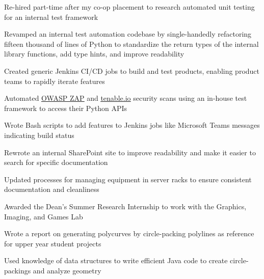 \begin{bullets}
    \item Re-hired part-time after my co-op placement to research automated unit testing for an internal test framework
    \item Revamped an internal test automation codebase by single-handedly refactoring fifteen thousand of lines of Python to standardize the return types of the internal library functions, add type hints, and improve readability
    \item Created generic Jenkins CI/CD jobs to build and test products, enabling product teams to rapidly iterate features
    \item Automated \href{https://www.zaproxy.org/}{\underline{OWASP ZAP}} and \href{https://www.tenable.com/products/tenable-io}{\underline{tenable.io}} security scans using an in-house test framework to access their Python APIs
    \item Wrote Bash scripts to add features to Jenkins jobs like Microsoft Teams messages indicating build status
    \item Rewrote an internal SharePoint site to improve readability and make it easier to search for specific documentation
    \item Updated processes for managing equipment in server racks to ensure consistent documentation and cleanliness
\end{bullets}

\hbox{}

\begin{bullets}
    \item Awarded the Dean's Summer Research Internship to work with the Graphics, Imaging, and Games Lab
    \item Wrote a report on generating polycurves by circle-packing polylines as reference for upper year student projects
    \item Used knowledge of data structures to write efficient Java code to create circle-packings and analyze geometry
\end{bullets}


